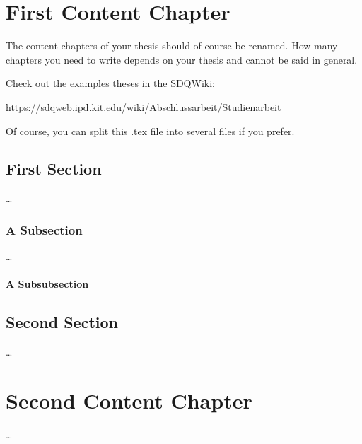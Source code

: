
\chapter{First Content Chapter}
\label{ch:FirstContent}

The content chapters of your thesis should of course be renamed. How many
chapters you need to write depends on your thesis and cannot be said in general.

Check out the examples theses in the SDQWiki:

\url{https://sdqweb.ipd.kit.edu/wiki/Abschlussarbeit/Studienarbeit}

Of course, you can split this .tex file into several files if you prefer. 


\section{First Section}
\label{sec:FirstContent:FirstSection}

\dots

\subsection{A Subsection}
\label{sec:FirstContent:FirstSubSection}

\dots

\subsubsection{A Subsubsection}

\section{Second Section}
\label{sec:FirstContent:SecondSection}

\dots


\chapter{Second Content Chapter}
\label{ch:SecondContent}

\dots

